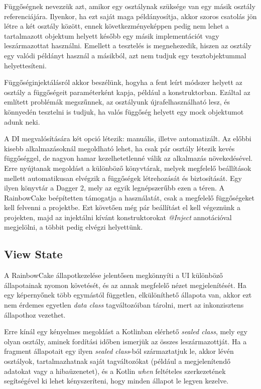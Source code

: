 Függőségnek nevezzük azt, amikor egy osztálynak szüksége van egy másik osztály referenciájára. Ilyenkor, ha ezt saját maga példányosítja, akkor szoros csatolás jön létre a két osztály között, ennek következményeképpen pedig nem lehet a tartalmazott objektum helyett később egy másik implementációt vagy leszármazottat használni. Emellett a tesztelés is megnehezedik, hiszen az osztály egy valódi példányt használ a másikból, azt nem tudjuk egy tesztobjektummal helyettesíteni.

Függőséginjektálásról akkor beszélünk, hogyha a fent leírt módszer helyett az osztály a függőségeit paraméterként kapja, például a konstruktorban. Ezáltal az említett problémák megszűnnek, az osztályunk újrafelhasználható lesz, és könnyedén tesztelni is tudjuk, ha valós függőség helyett egy mock objektumot adunk neki. 

A DI megvalósítására két opció létezik: manuális, illetve automatizált. Az előbbi kisebb alkalmazásoknál megoldható lehet, ha csak pár osztály létezik kevés függőséggel, de nagyon hamar kezelhetetlenné válik az alkalmazás növekedésével. Erre nyújtanak megoldást a különböző könyvtárak, melyek megfelelő beállítások mellett automatikusan elvégzik a függőségek létrehozását és biztosítását. 
Egy ilyen könyvtár a Dagger 2, mely az egyik legnépszerűbb ezen a téren. A RainbowCake beépítetten támogatja a használatát, csak a megfelelő függőségeket kell felvenni a projektbe. Ezt követően még pár beállítást el kell végeznünk a projekten, majd az injektálni kívánt konstruktorokat \emph{@Inject} annotációval megjelölni, a többit pedig elvégzi helyettünk.

\subsection{View State}
A RainbowCake állapotkezelése jelentősen megkönnyíti a UI különböző állapotainak nyomon követését, és az annak megfelelő nézet megjelenítését. Ha egy képernyőnek több egymástól független, elkülöníthető állapota van, akkor ezt nem érdemes egyetlen \emph{data class} tagváltozóiban tárolni, mert az inkonzisztens állapothoz vezethet.\cite{ViewState} 

Erre kínál egy kényelmes megoldást a Kotlinban elérhető \emph{sealed class}, mely egy olyan osztály, aminek fordítási időben ismerjük az összes leszármazottját. Ha a fragment állapotait egy ilyen \emph{sealed class}-ból származtatjuk le, akkor lévén osztályok, tartalmazhatnak saját tagváltozókat (például a megjelenítendő adatokat vagy a hibaüzenetet), és a Kotlin \emph{when} feltételes szerkezetének segítségével ki lehet kényszeríteni, hogy minden állapot le legyen kezelve. 

